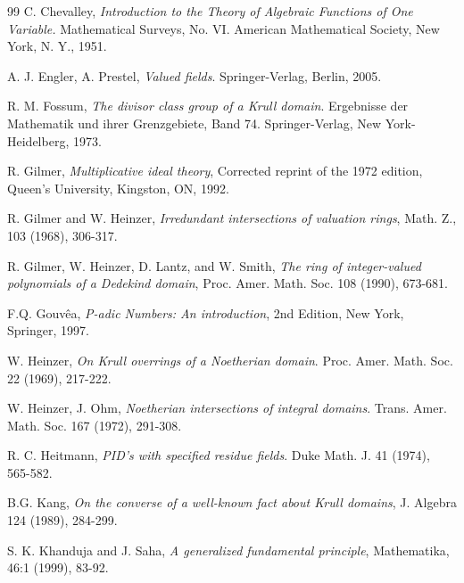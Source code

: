 \documentclass[10pt]{article}
\numberwithin{equation}{section}
\theoremstyle{definition}
\theoremstyle{definition}
\begin{document}
\begin{thebibliography}{99}
 C. Chevalley, \emph{Introduction to the Theory of Algebraic Functions of One Variable.} Mathematical Surveys, No. VI. American Mathematical Society, New York, N. Y., 1951.



 A. J. Engler, A. Prestel, \emph{Valued fields}. Springer-Verlag, Berlin, 2005.


 R. M.  Fossum, \emph{The divisor class group of a Krull domain}. Ergebnisse der Mathematik und ihrer Grenzgebiete, Band 74. Springer-Verlag, New York-Heidelberg, 1973.


 R. Gilmer, \emph{Multiplicative ideal theory}, Corrected reprint of the 1972 edition, Queen's University, Kingston, ON, 1992.

 R. Gilmer and W. Heinzer, \emph{Irredundant intersections of valuation rings}, Math. Z., 103 (1968), 306-317.

 R. Gilmer, W. Heinzer, D. Lantz, and W. Smith,
{\em The ring of integer-valued polynomials of a Dedekind domain}, Proc. Amer. Math. Soc.
108 (1990), 673-681.

 F.Q. Gouv\^ea, {\em P-adic Numbers: An introduction}, 2nd Edition, New York, Springer, 1997.

 W. Heinzer, \emph{On Krull overrings of a Noetherian domain}. Proc. Amer. Math. Soc. 22 (1969), 217-222.

 W. Heinzer, J. Ohm, \emph{Noetherian intersections of integral domains}. Trans. Amer. Math. Soc. 167 (1972), 291-308.

 R. C. Heitmann, \emph{PID's with specified residue fields}. Duke Math. J. 41 (1974), 565-582.

 B.G. Kang,  {\em On the converse of a well-known fact about Krull domains}, J. Algebra 124 (1989), 284-299.


 S. K. Khanduja and J. Saha, \emph{A generalized fundamental principle}, Mathematika, 46:1 (1999), 83-92.



\end{thebibliography}
\end{document}

